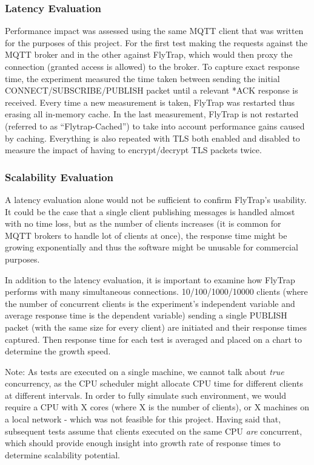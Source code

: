 \subsubsection{Latency Evaluation} Performance impact was assessed using the same MQTT client that was written for the purposes of this project. For the first test making the requests against the MQTT broker and in the other against FlyTrap, which would then proxy the connection (granted access is allowed) to the broker. To capture exact response time, the experiment measured the time taken between sending the initial CONNECT/SUBSCRIBE/PUBLISH packet until a relevant *ACK response is received. Every time a new measurement is taken, FlyTrap was restarted thus erasing all in-memory cache. In the last measurement, FlyTrap is not restarted (referred to as ``Flytrap-Cached'') to take into account performance gains caused by caching. Everything is also repeated with TLS both enabled and disabled to measure the impact of having to encrypt/decrypt TLS packets twice.
\subsubsection{Scalability Evaluation}
A latency evaluation alone would not be sufficient to confirm FlyTrap's usability. It could be the case that a single client publishing messages is handled almost with no time loss, but as the number of clients increases (it is common for MQTT brokers to handle lot of clients at once), the response time might be growing exponentially and thus the software might be unusable for commercial purposes. 

In addition to the latency evaluation, it is important to examine how FlyTrap performs with many simultaneous connections. 10/100/1000/10000 clients (where the number of concurrent clients is the experiment's independent variable and average response time is the dependent variable) sending a single PUBLISH packet (with the same size for every client) are initiated and their response times captured. Then response time for each test is averaged and placed on a chart to determine the growth speed.  

Note: As tests are executed on a single machine, we cannot talk about \textit{true} concurrency, as the CPU scheduler might allocate CPU time for different clients at different intervals. In order to fully simulate such environment, we would require a CPU with X cores (where X is the number of clients), or X machines on a local network - which was not feasible for this project. Having said that, subsequent tests assume that clients executed on the same CPU \textit{are} concurrent, which should provide enough insight into growth rate of response times to determine scalability potential.
